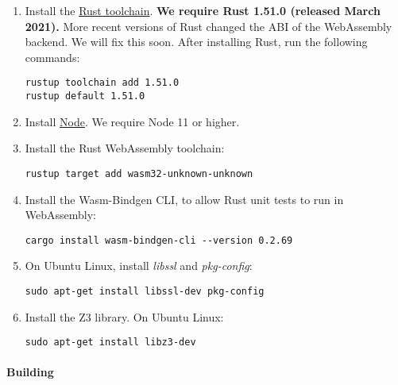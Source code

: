 \documentclass{book}
\begin{document}
\begin{enumerate}

\item Install the \href{https://rustup.rs/}{Rust toolchain}.
\textbf{We require Rust 1.51.0 (released March 2021).} More recent versions of
Rust changed the ABI of the WebAssembly backend. We will fix this soon.
After installing Rust, run the following commands:

\begin{verbatim}
rustup toolchain add 1.51.0
rustup default 1.51.0
\end{verbatim}

\item Install \href{https://nodejs.org/en/}{Node}. We require Node 11 or higher.

\item Install the Rust WebAssembly toolchain:

\begin{verbatim}
rustup target add wasm32-unknown-unknown
\end{verbatim}

\item Install the Wasm-Bindgen CLI, to allow Rust unit tests to run in WebAssembly:

\begin{verbatim}
cargo install wasm-bindgen-cli --version 0.2.69
\end{verbatim}

\item On Ubuntu Linux, install \emph{libssl} and \emph{pkg-config}:

\begin{verbatim}
sudo apt-get install libssl-dev pkg-config
\end{verbatim}

\item Install the Z3 library. On Ubuntu Linux:

\begin{verbatim}
sudo apt-get install libz3-dev
\end{verbatim}

\end{enumerate}

\paragraph{Building}
\end{document}
